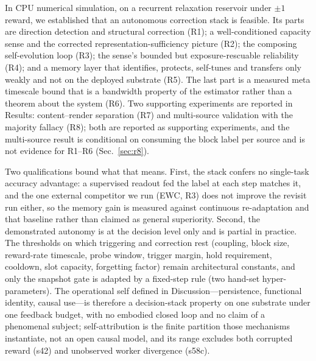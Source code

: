 \documentclass[preprint,12pt]{elsarticle}
\begin{document}
In CPU numerical simulation, on a recurrent relaxation reservoir under
$\pm1$ reward, we established that an autonomous correction stack is
feasible. Its parts are direction
detection and structural correction (R1); a well-conditioned capacity sense
and the corrected representation-sufficiency picture (R2); the composing
self-evolution loop (R3); the sense's bounded but exposure-rescuable
reliability (R4); and a memory layer that identifies, protects, self-tunes and
transfers only weakly and not on the deployed substrate (R5). The last part is
a measured
meta timescale bound that is a bandwidth property of the estimator rather than
a theorem about the system (R6). Two supporting experiments are reported in
Results: content--render separation (R7) and multi-source validation with the
majority fallacy (R8); both are reported as supporting experiments, and the
multi-source result is conditional on consuming the block label per source
and is not evidence for R1--R6 (Sec.~\ref{sec:r8}).

Two qualifications bound what that means. First, the stack confers no
single-task accuracy advantage: a supervised readout fed the label at each
step matches it, and the one external competitor we run (EWC, R3) does not
improve the revisit run either, so the memory gain is measured against
continuous re-adaptation and that baseline rather than claimed as general
superiority. Second, the demonstrated autonomy is at the decision level
only and is partial in practice. The thresholds on which triggering and
correction rest (coupling, block size, reward-rate timescale, probe window,
trigger margin, hold requirement, cooldown, slot capacity, forgetting
factor) remain architectural constants, and only the snapshot gate is
adapted by a fixed-step rule (two hand-set hyper-parameters). The
operational self defined in Discussion---persistence, functional identity,
causal use---is therefore a decision-stack property on one substrate under
one feedback budget, with no embodied closed loop and no claim of a
phenomenal subject; self-attribution is the finite partition those
mechanisms instantiate, not an open causal model, and its range excludes
both corrupted reward (s42) and unobserved worker divergence (s58c).
\end{document}
